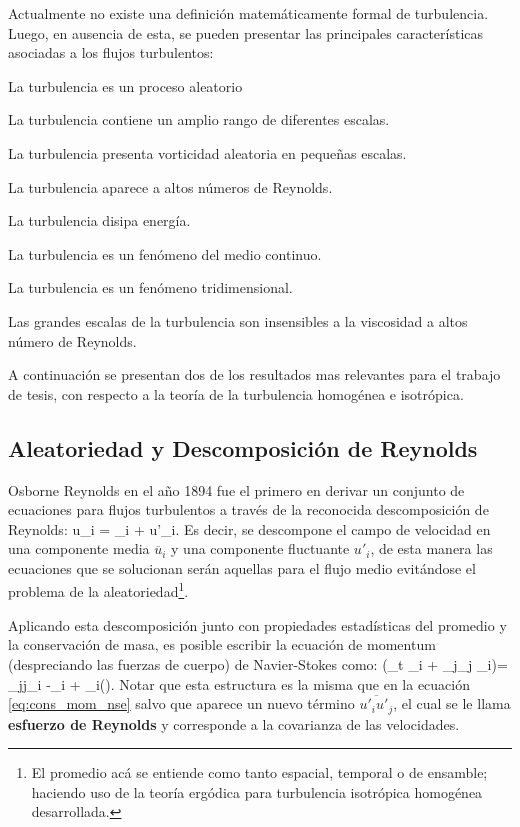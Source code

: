 Actualmente no existe una definición matemáticamente formal de turbulencia. Luego, en ausencia de esta, se pueden presentar las principales características asociadas a los flujos turbulentos:
\begin{itemize*}
	\item La turbulencia es un proceso aleatorio
	\item La turbulencia contiene un amplio rango de diferentes escalas.
	\item La turbulencia presenta vorticidad aleatoria en pequeñas escalas.
	\item La turbulencia aparece a altos números de Reynolds.
	\item La turbulencia disipa energía.
	\item La turbulencia es un fenómeno del medio continuo.
	\item La turbulencia es un fenómeno tridimensional.
	\item Las grandes escalas de la turbulencia son insensibles a la viscosidad a altos número de Reynolds.
\end{itemize*}

A continuación se presentan dos de los resultados mas relevantes para el trabajo de tesis, con respecto a la teoría de la turbulencia homogénea e isotrópica.
\subsection{Aleatoriedad y Descomposición de Reynolds}
Osborne Reynolds en el año 1894 fue el primero en derivar un conjunto de ecuaciones para flujos turbulentos a través de la reconocida descomposición de Reynolds:
\be u_i = _i + u'_i. \ee
Es decir, se descompone el campo de velocidad en una componente media $\overline{u}_i$ y una componente fluctuante $u'_i$, de esta manera las ecuaciones que se solucionan serán aquellas para el flujo medio evitándose el problema de la aleatoriedad\footnote{El promedio acá se entiende como tanto espacial, temporal o de ensamble; haciendo uso de la teoría ergódica para turbulencia isotrópica homogénea desarrollada.}.

Aplicando esta descomposición junto con propiedades estadísticas del promedio y la conservación de masa, es posible escribir la ecuación de momentum (despreciando las fuerzas de cuerpo) de Navier-Stokes como:
\be\label{eq:03_cons_mom_rans}
(\partial_t _i + _j\partial_j _i)= \nu\partial_{jj}_i -\partial_i  + \partial_i().
\ee
Notar que esta estructura es la misma que en la ecuación \ref{eq:cons_mom_nse} salvo que aparece un nuevo término $\overline{u'_iu'_j}$, el cual se le llama \textbf{esfuerzo de Reynolds} y corresponde a la covarianza de las velocidades.

